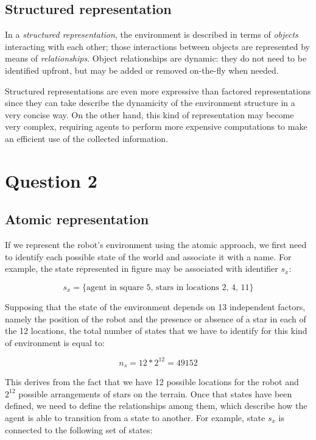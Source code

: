 \documentclass[letterpaper,headings=standardclasses]{scrartcl}
\begin{document}
\subsection{Structured representation}

In a \emph{structured representation}, the environment is described in terms of \emph{objects} interacting with each other; those interactions between objects are represented by means of \emph{relationships}. Object relationships are dynamic: they do not need to be identified upfront, but may be added or removed on-the-fly when needed.

Structured representations are even more expressive than factored representations since they can take describe the dynamicity of the environment structure in a very concise way. On the other hand, this kind of representation may become very complex, requiring agents to perform more expensive computations to make an efficient use of the collected information.

\section{Question 2}

\subsection{Atomic representation}

If we represent the robot’s environment using the atomic approach, we first need to identify each possible state of the world and associate it with a name. For example, the state represented in figure may be associated with identifier $s_x$:

$$ s_x = \{ \text{agent in square 5, stars in locations 2, 4, 11} \} $$

Supposing that the state of the environment depends on 13 independent factors, namely the position of the robot and the presence or absence of a star in each of the 12 locations, the total number of states that we have to identify for this kind of environment is equal to:

$$ n_s = 12 * 2^{12} = 49152 $$

This derives from the fact that we have 12 possible locations for the robot and $2^{12}$ possible arrangements of stars on the terrain. Once that states have been defined, we need to define the relationships among them, which describe how the agent is able to transition from a state to another. For example, state $s_x$ is connected to the following set of states:
\end{document}
